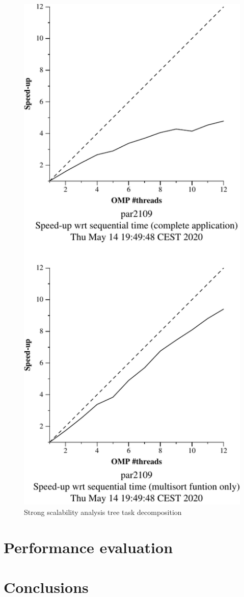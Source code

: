 \begin{figure}[H]
    \begin{minipage}{0.5\textwidth}
        \centering
        \includegraphics[width=0.7\linewidth]{plots/new-omp-tree-crop.pdf}
        \caption{Strong scalability analysis tree task decomposition}
        \label{fig:ssa_tree} 
    \end{minipage}
\end{figure}

\section{Performance evaluation}%
\label{sec:perf_eval}

\section{Conclusions}%
\label{sec:conclusions}


